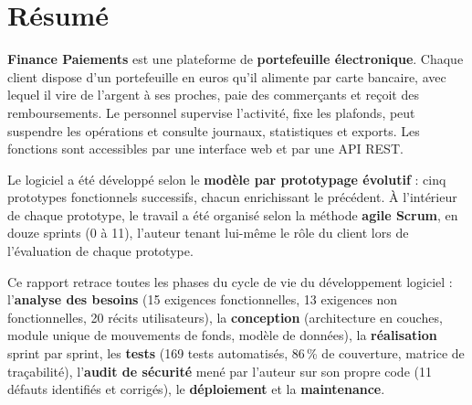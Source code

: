 \documentclass[11pt,a4paper]{report}
\begin{document}
\begin{titlepage}
\vfill
{}
\restoregeometry
\end{titlepage}

\chapter*{Résumé}

\textbf{Finance Paiements} est une plateforme de \textbf{portefeuille électronique}.
Chaque client dispose d'un portefeuille en euros qu'il alimente par carte bancaire,
avec lequel il vire de l'argent à ses proches, paie des commerçants et reçoit des
remboursements. Le personnel supervise l'activité, fixe les plafonds, peut suspendre
les opérations et consulte journaux, statistiques et exports. Les fonctions sont
accessibles par une interface web et par une API REST.

Le logiciel a été développé selon le \textbf{modèle par prototypage évolutif} :
cinq prototypes fonctionnels successifs, chacun enrichissant le précédent. À
l'intérieur de chaque prototype, le travail a été organisé selon la méthode
\textbf{agile Scrum}, en douze sprints (0 à 11), l'auteur tenant lui-même le rôle du
client lors de l'évaluation de chaque prototype.

Ce rapport retrace toutes les phases du cycle de vie du développement logiciel :
l'\textbf{analyse des besoins} (15 exigences fonctionnelles, 13 exigences non
fonctionnelles, 20 récits utilisateurs), la \textbf{conception} (architecture en
couches, module unique de mouvements de fonds, modèle de données), la
\textbf{réalisation} sprint par sprint, les \textbf{tests} (169 tests automatisés,
86\,\% de couverture, matrice de traçabilité), l'\textbf{audit de sécurité} mené par
l'auteur sur son propre code (11 défauts identifiés et corrigés), le
\textbf{déploiement} et la \textbf{maintenance}.
\end{document}
